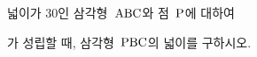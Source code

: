 넓이가 $30$인 삼각형~$\mathrm{ABC}$와 점~$\mathrm{P}$에 대하여 \par\smallskip{}\par\smallskip\noindent 가 성립할 때, 삼각형~$\mathrm{PBC}$의 넓이를 구하시오.
